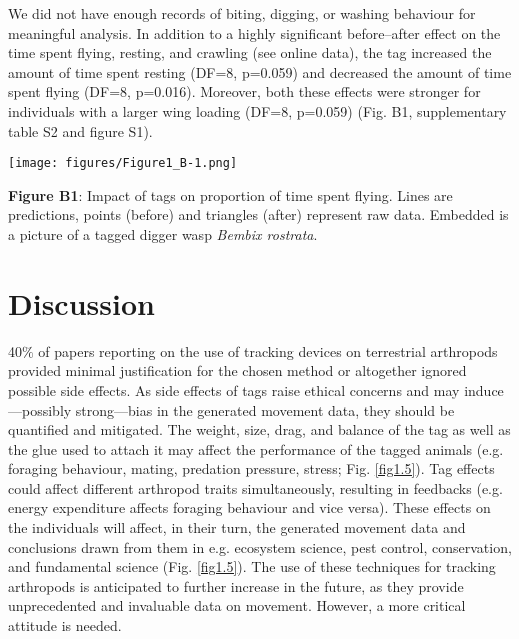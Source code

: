\documentclass[10pt, twoside]{book} %
\begin{document}
\begin{tcolorbox}[box, breakable, boxrule=1pt,toprule at break=1pt,extras={toprule at break=1pt}]
		We did not have enough records of biting, digging, or washing behaviour for meaningful analysis. In addition to a highly significant before--after effect on the time spent flying, resting, and crawling (see online data), the tag increased the amount of time spent resting (DF=8, p=0.059) and decreased the amount of time spent flying (DF=8, p=0.016). Moreover, both these effects were stronger for individuals with a larger wing loading (DF=8, p=0.059) (Fig. B1, supplementary table S2 and figure S1).\\
		
			\begin{center}
				\texttt{[image: figures/Figure1\_B-1.png]}
			\end{center}
			\begin{footnotesize}
				\textbf{Figure B1}: Impact of tags on proportion of time spent flying. Lines are predictions, points (before) and triangles (after) represent raw data. Embedded is a picture of a tagged digger wasp \textit{Bembix rostrata}.
			\end{footnotesize}
	\end{tcolorbox}

\clearpage
	\section{Discussion}
	40$\%$ of papers reporting on the use of tracking devices on terrestrial arthropods provided minimal justification for the chosen method or altogether ignored possible side effects. As side effects of tags raise ethical concerns \citep{drinkwater2019} and may induce---possibly strong---bias in the generated movement data, they should be quantified and mitigated. The weight, size, drag, and balance of the tag as well as the glue used to attach it may affect the performance of the tagged animals (e.g. foraging behaviour, mating, predation pressure, stress; Fig. \ref{fig1.5}). Tag effects could affect different arthropod traits simultaneously, resulting in feedbacks (e.g. energy expenditure affects foraging behaviour and vice versa). These effects on the individuals will affect, in their turn, the generated movement data and conclusions drawn from them in e.g. ecosystem science, pest control, conservation, and fundamental science (Fig. \ref{fig1.5}). The use of these techniques for tracking arthropods is anticipated to further increase in the future, as they provide unprecedented and invaluable data on movement. However, a more critical attitude is needed.\\
	
\end{document}
